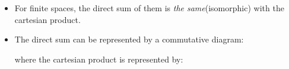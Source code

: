 \begin{add}
\leavevmode
\begin{itemize}
\item For finite spaces, the direct sum of them is \textit{the same}(isomorphic) with the cartesian product.
\item The direct sum can be represented by a commutative diagram: \begin{center}
\leavevmode
\xy
{}
\endxy
\end{center} where the cartesian product is represented by:
\begin{center}
\leavevmode
\xy
{}
\endxy
\end{center}


\end{itemize}
\end{add}

\newpage

